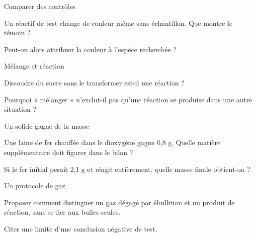 \clearpage{}
\par\noindent\begin{minipage}{\linewidth}
\begin{exercice}[3]{Comparer des contrôles}
\begin{questions}
\item Un réactif de test change de couleur même sans échantillon. Que montre le témoin ?
\item Peut-on alors attribuer la couleur à l’espèce recherchée ?
\end{questions}
\end{exercice}
\end{minipage}
\par\noindent\begin{minipage}{\linewidth}
\begin{exercice}[3]{Mélange et réaction}
\begin{questions}
\item Dissoudre du sucre sans le transformer est-il une réaction ?
\item Pourquoi « mélanger » n’exclut-il pas qu’une réaction se produise dans une autre situation ?
\end{questions}
\end{exercice}
\end{minipage}
\par\noindent\begin{minipage}{\linewidth}
\begin{exercice}[3]{Un solide gagne de la masse}
\begin{questions}
\item Une laine de fer chauffée dans le dioxygène gagne 0,8 g. Quelle matière supplémentaire doit figurer dans le bilan ?
\item Si le fer initial pesait 2,1 g et réagit entièrement, quelle masse finale obtient-on ?
\end{questions}
\end{exercice}
\end{minipage}
\par\noindent\begin{minipage}{\linewidth}
\begin{exercice}[3]{Un protocole de gaz}
\begin{questions}
\item Proposer comment distinguer un gaz dégagé par ébullition et un produit de réaction, sans se fier aux bulles seules.
\item Citer une limite d’une conclusion négative de test.
\end{questions}
\end{exercice}
\end{minipage}
